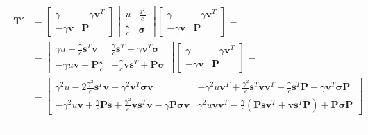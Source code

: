 \documentclass[letterpaper,10pt,english]{jupyterBook}
\begin{document}
\begin{equation*}
\begin{split}
\begin{aligned}
 \mathbf{T}' 
 & = \begin{bmatrix} \gamma & - \gamma \mathbf{v}^T \\ -\gamma \mathbf{v} & \mathbf{P} \end{bmatrix}
\begin{bmatrix} u & \frac{\mathbf{s}^T}{c} \\ \frac{\mathbf{s}}{c} & \symbf{\sigma} \end{bmatrix}
\begin{bmatrix} \gamma & - \gamma \mathbf{v}^T \\ -\gamma \mathbf{v} & \mathbf{P} \end{bmatrix} = \\
 & =
\begin{bmatrix} \gamma u - \frac{\gamma}{c} \mathbf{s}^T \mathbf{v} & \frac{\gamma}{c} \mathbf{s}^T - \gamma \mathbf{v}^T \symbf{\sigma} \\ -\gamma u \mathbf{v} + \mathbf{P} \frac{\mathbf{s}}{c} & -\frac{\gamma}{c} \mathbf{v} \mathbf{s}^T + \mathbf{P} \symbf{\sigma} \end{bmatrix}
\begin{bmatrix} \gamma & - \gamma \mathbf{v}^T \\ -\gamma \mathbf{v} & \mathbf{P}  \end{bmatrix} = \\
 & =\begin{bmatrix}
      \gamma^2 u - 2 \frac{\gamma^2}{c} \mathbf{s}^T \mathbf{v} + \gamma^2 \mathbf{v}^T \symbf{\sigma} \mathbf{v} &
      -\gamma^2 u \mathbf{v}^T + \frac{\gamma^2}{c} \mathbf{s}^T \mathbf{v} \mathbf{v}^T + \frac{\gamma}{c} \mathbf{s}^T \mathbf{P} - \gamma \mathbf{v}^T \symbf{\sigma} \mathbf{P} \\
      -\gamma^2 u \mathbf{v} + \frac{\gamma}{c} \mathbf{P} \mathbf{s} + \frac{\gamma^2}{c} \mathbf{v} \mathbf{s}^T \mathbf{v}  - \gamma  \mathbf{P}\symbf{\sigma} \mathbf{v} &
      \gamma^2 u \mathbf{v} \mathbf{v}^T - \frac{\gamma}{c} \left( \mathbf{P} \mathbf{s} \mathbf{v}^T + \mathbf{v} \mathbf{s}^T \mathbf{P} \right) + \mathbf{P} \symbf{\sigma} \mathbf{P}
    \end{bmatrix}
\end{aligned}\end{split}
\end{equation*}

\bigskip\hrule\bigskip


\sphinxstepscope
\end{document}

